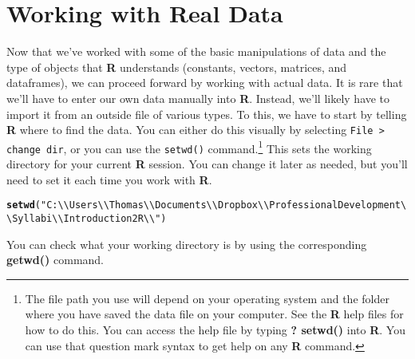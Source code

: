 \documentclass[12pt]{article}\usepackage[]{graphicx}\usepackage[]{color}
\makeatletter
\newcommand{\hlstr}[1]{\textcolor[rgb]{0.192,0.494,0.8}{#1}}%
\newcommand{\hlstd}[1]{\textcolor[rgb]{0.345,0.345,0.345}{#1}}%
\newcommand{\hlkwd}[1]{\textcolor[rgb]{0.737,0.353,0.396}{\textbf{#1}}}%
\newenvironment{kframe}{%
 \def\at@end@of@kframe{}%
 \ifinner\ifhmode%
  \def\at@end@of@kframe{\end{minipage}}%
  \begin{minipage}{\columnwidth}%
 \fi\fi%
 \def\FrameCommand##1{\hskip\@totalleftmargin \hskip-\fboxsep
 \colorbox{shadecolor}{##1}\hskip-\fboxsep
     \hskip-\linewidth \hskip-\@totalleftmargin \hskip\columnwidth}%
 \MakeFramed {\advance\hsize-\width
   \@totalleftmargin\z@ \linewidth\hsize
   \@setminipage}}%
 {\par\unskip\endMakeFramed%
 \at@end@of@kframe}
\newenvironment{knitrout}{}{} %
\makeatother
\begin{document}
\section{Working with Real Data}\label{sec:data}
Now that we've worked with some of the basic manipulations of data and the type of objects that \textbf{R} understands (constants, vectors, matrices, and dataframes), we can proceed forward by working with actual data. It is rare that we'll have to enter our own data manually into \textbf{R}. Instead, we'll likely have to import it from an outside file of various types. To this, we have to start by telling \textbf{R} where to find the data. You can either do this visually by selecting \verb|File > change dir|, or you can use the \verb|setwd()| command.\footnote{The file path you use will depend on your operating system and the folder where you have saved the data file on your computer. See the \textbf{R} help files for how to do this. You can access the help file by typing \textbf{? setwd()} into \textbf{R}. You can use that question mark syntax to get help on any \textbf{R} command.} This sets the working directory for your current \textbf{R} session. You can change it later as needed, but you'll need to set it each time you work with \textbf{R}.
\begin{knitrout}
\color{fgcolor}\begin{kframe}
\begin{alltt}
\hlkwd{setwd}\hlstd{(}\hlstr{"C:\textbackslash{}\textbackslash{}Users\textbackslash{}\textbackslash{}Thomas\textbackslash{}\textbackslash{}Documents\textbackslash{}\textbackslash{}Dropbox\textbackslash{}\textbackslash{}Professional Development\textbackslash{}\textbackslash{}Syllabi\textbackslash{}\textbackslash{}Introduction2R\textbackslash{}\textbackslash{}"}\hlstd{)}
\end{alltt}


{\ttfamily\noindent\bfseries\color{errorcolor}{\#\# Error: cannot change working directory}}\end{kframe}
\end{knitrout}

You can check what your working directory is by using the corresponding \textbf{getwd()} command.
\end{document}
